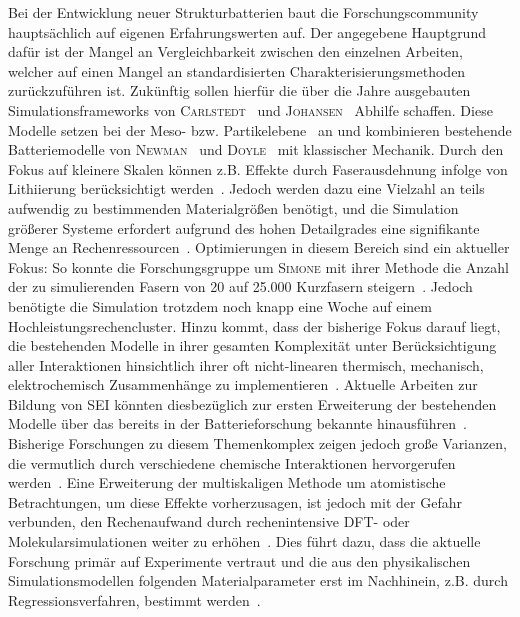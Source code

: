 Bei der Entwicklung neuer Strukturbatterien baut die Forschungscommunity hauptsächlich auf eigenen Erfahrungswerten auf. Der angegebene Hauptgrund dafür ist der Mangel an Vergleichbarkeit zwischen den einzelnen Arbeiten, welcher auf einen Mangel an standardisierten Charakterisierungsmethoden zurückzuführen ist. Zukünftig sollen hierfür die über die Jahre ausgebauten Simulationsframeworks von \textsc{Carlstedt}~\cite{Carlstedt2022,Carlstedt2022a,Carlstedt2022b} und \textsc{Johansen}~\cite{Larsson2023,Siraj2023,Johansen2024} Abhilfe schaffen. Diese Modelle setzen bei der Meso- bzw. Partikelebene~\cite{Carlstedt2020b,Carlstedt2022a} an und kombinieren bestehende Batteriemodelle von \textsc{Newman}~\cite{Bernardi1985,Pals1995,Pals1995a,Christensen2006,Newman2021} und \textsc{Doyle}~\cite{Doyle1993,Doyle1995} mit klassischer Mechanik. Durch den Fokus auf kleinere Skalen können z.B. Effekte durch Faserausdehnung infolge von Lithiierung berücksichtigt werden~\cite{Carlstedt2019,Carlstedt2020b,Duan2021,Johansen2024}. Jedoch werden dazu eine Vielzahl an teils aufwendig zu bestimmenden Materialgrößen benötigt, und die Simulation größerer Systeme erfordert aufgrund des hohen Detailgrades eine signifikante Menge an Rechenressourcen~\cite{Carlstedt2019,Carlstedt2020b,Carlstedt2022a}. Optimierungen in diesem Bereich sind ein aktueller Fokus: So konnte die Forschungsgruppe um \textsc{Simone} mit ihrer Methode die Anzahl der zu simulierenden Fasern von 20 auf 25.000 Kurzfasern steigern~\cite{Goudarzi2022}. Jedoch benötigte die Simulation trotzdem noch knapp eine Woche auf einem Hochleistungsrechencluster. Hinzu kommt, dass der bisherige Fokus darauf liegt, die bestehenden Modelle in ihrer gesamten Komplexität unter Berücksichtigung aller Interaktionen hinsichtlich ihrer oft nicht-linearen thermisch, mechanisch, elektrochemisch Zusammenhänge zu implementieren~\cite{Carlstedt2019,Carlstedt2020b,Carlstedt2022a,Johansen2024}. Aktuelle Arbeiten zur Bildung von SEI könnten diesbezüglich zur ersten Erweiterung der bestehenden Modelle über das bereits in der Batterieforschung bekannte hinausführen~\cite{Yuecel2024}. Bisherige Forschungen zu diesem Themenkomplex zeigen jedoch große Varianzen, die vermutlich durch verschiedene chemische Interaktionen hervorgerufen werden~\cite{Rollin2023,Yuecel2024}. Eine Erweiterung der multiskaligen Methode um atomistische Betrachtungen, um diese Effekte vorherzusagen, ist jedoch mit der Gefahr verbunden, den Rechenaufwand durch rechenintensive DFT- oder Molekularsimulationen weiter zu erhöhen~\cite{Franco2019,Li2020a,Rollin2023}. Dies führt dazu, dass die aktuelle Forschung primär auf Experimente vertraut und die aus den physikalischen Simulationsmodellen folgenden Materialparameter erst im Nachhinein, z.B. durch Regressionsverfahren, bestimmt werden~\cite{Franco2013, Carlstedt2022, Carlstedt2023}.

